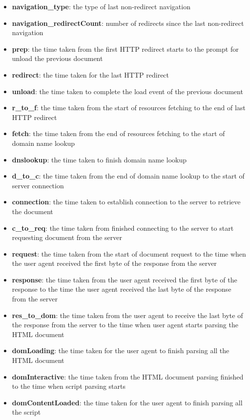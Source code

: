 \documentclass[12pt]{article}
\begin{document}
\begin{itemize}
  \item \textbf{navigation\_type}: the type of last non-redirect navigation
  \item \textbf{navigation\_redirectCount}: number of redirects since the last non-redirect navigation
  \item \textbf{prep}: the time taken from the first HTTP redirect starts to the prompt for unload the previous document
  \item \textbf{redirect}: the time taken for the last HTTP redirect
  \item \textbf{unload}: the time taken to complete the load event of the previous document
  \item \textbf{r\_to\_f}: the time taken from the start of resources fetching to the end of last HTTP redirect
  \item \textbf{fetch}: the time taken from the end of resources fetching to the start of domain name lookup
  \item \textbf{dnslookup}: the time taken to finish domain name lookup
  \item \textbf{d\_to\_c}: the time taken from the end of domain name lookup to the start of server connection
  \item \textbf{connection}: the time taken to establish connection to the server to retrieve the document 
  \item \textbf{c\_to\_req}: the time taken from finished connecting to the server to start requesting document from the server
  \item \textbf{request}: the time taken from the start of document request to the time when the user agent received the first byte of the response from the server
  \item \textbf{response}: the time taken from the user agent received the first byte of the response to the time the user agent received the last byte of the response from the server
  \item \textbf{res\_to\_dom}: the time taken from the user agent to receive the last byte of the response from the server to the time when user agent starts parsing the HTML document
  \item \textbf{domLoading}: the time taken for the user agent to finish parsing all the HTML document
  \item \textbf{domInteractive}: the time taken from the HTML document parsing finished to the time when script parsing starts
  \item \textbf{domContentLoaded}: the time taken for the user agent to finish parsing all the script

\end{itemize}
\end{document}
